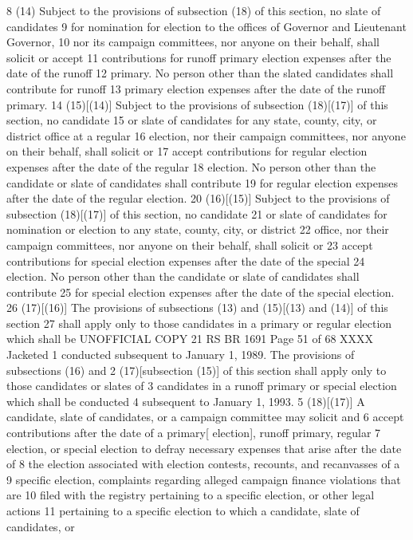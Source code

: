 8 (14) Subject to the provisions of subsection (18) of this section, no slate of candidates
9 for nomination for election to the offices of Governor and Lieutenant Governor,
10 nor its campaign committees, nor anyone on their behalf, shall solicit or accept
11 contributions for runoff primary election expenses after the date of the runoff
12 primary. No person other than the slated candidates shall contribute for runoff
13 primary election expenses after the date of the runoff primary.
14 (15)[(14)] Subject to the provisions of subsection (18)[(17)] of this section, no candidate
15 or slate of candidates for any state, county, city, or district office at a regular
16 election, nor their campaign committees, nor anyone on their behalf, shall solicit or
17 accept contributions for regular election expenses after the date of the regular
18 election. No person other than the candidate or slate of candidates shall contribute
19 for regular election expenses after the date of the regular election.
20 (16)[(15)] Subject to the provisions of subsection (18)[(17)] of this section, no candidate
21 or slate of candidates for nomination or election to any state, county, city, or district
22 office, nor their campaign committees, nor anyone on their behalf, shall solicit or
23 accept contributions for special election expenses after the date of the special
24 election. No person other than the candidate or slate of candidates shall contribute
25 for special election expenses after the date of the special election.
26 (17)[(16)] The provisions of subsections (13) and (15)[(13) and (14)] of this section
27 shall apply only to those candidates in a primary or regular election which shall be 
UNOFFICIAL COPY 21 RS BR 1691
Page 51 of 68
XXXX Jacketed
1 conducted subsequent to January 1, 1989. The provisions of subsections (16) and
2 (17)[subsection (15)] of this section shall apply only to those candidates or slates of
3 candidates in a runoff primary or special election which shall be conducted
4 subsequent to January 1, 1993.
5 (18)[(17)] A candidate, slate of candidates, or a campaign committee may solicit and
6 accept contributions after the date of a primary[ election], runoff primary, regular
7 election, or special election to defray necessary expenses that arise after the date of
8 the election associated with election contests, recounts, and recanvasses of a
9 specific election, complaints regarding alleged campaign finance violations that are
10 filed with the registry pertaining to a specific election, or other legal actions
11 pertaining to a specific election to which a candidate, slate of candidates, or
